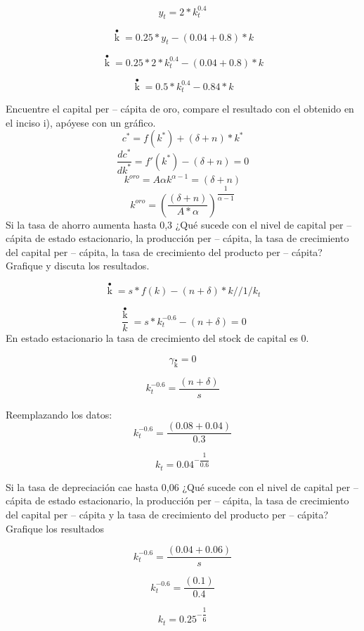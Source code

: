 \documentclass{oxmathproblems}
\begin{document}
\begin{questions}
\begin{parts}
\begin{subparts}
     $$y_t = 2*k_t^{0.4}$$
     
     $$\mathop k \limits ^ \bullet   = 0.25*y_t - (0.04 + 0.8 )*k$$
    
    $$\mathop k \limits ^ \bullet   = 0.25*2*k_t^{0.4} - (0.04 + 0.8 )*k$$
    
    $$\mathop k \limits ^ \bullet   = 0.5*k_t^{0.4} - 0.84*k$$
    
    \subpart 
    Encuentre el capital per – cápita de oro, compare el resultado con el obtenido en el inciso i), apóyese con un gráfico.
    $$c^*=f(k^*)+(\delta + n)*k^*$$
    $$\dfrac{dc^*}{dk^*}=f'(k^*)-(\delta +n)=0$$
    $$k^{oro} = A\alpha k^{\alpha -1} = (\delta +n)$$
    $$k^{oro} = (\dfrac{(\delta +n)}{A * \alpha})^{\dfrac{1}{\alpha - 1}}$$
    \subpart 
    Si la tasa de ahorro aumenta hasta 0,3 ¿Qué sucede con el nivel de capital per – cápita de estado estacionario, la producción per – cápita, la tasa de crecimiento del capital per – cápita, la tasa de crecimiento del producto per – cápita? Grafique y discuta los resultados.
    
     $$\mathop k\limits^ \bullet   = s*f(k) - (n + \delta )*k // 1/k_t$$
     
     $$\dfrac{\mathop k\limits^ \bullet}{k} = s*k_t^{-0.6}-(n+\delta)=0$$
     En estado estacionario la tasa de crecimiento del stock de capital es 0.
     
     $$\gamma _{\mathop k\limits^ \bullet}=0$$
    
    $$k_t^{-0.6}=\dfrac{(n+\delta)}{s}$$
    
    Reemplazando los datos:
    $$k_t^{-0.6}=\dfrac{(0.08+0.04)}{0.3}$$
    
    $$k_t=0.04^{- \dfrac{1}{0.6}}$$
    
    \subpart 
    Si la tasa de depreciación cae hasta 0,06 ¿Qué sucede con el nivel de capital per – cápita de estado estacionario, la producción per – cápita, la tasa de crecimiento del capital per – cápita y la tasa de crecimiento del producto per – cápita? Grafique los resultados
    
    $$k_t^{-0.6}=\dfrac{(0.04+0.06)}{s}$$
    
    $$k_t^{-0.6}=\dfrac{(0.1)}{0.4}$$
    
    $$k_t=0.25^{- \dfrac{1}{6}}$$
    
    
    
    

\end{subparts}
\end{parts}
\end{questions}
\end{document}
